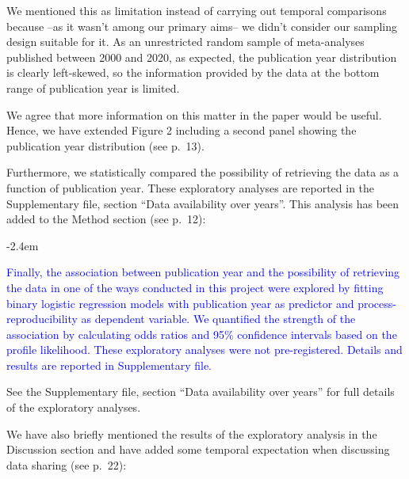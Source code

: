 \documentclass[draft]{article}
\renewenvironment{quote}{\begin{fquote}\advance\leftmargini -2.4em\begin{oldquote}}{\end{oldquote}\end{fquote}}
\newenvironment{fquote}
  {\def\FrameCommand{
	\fboxsep=0.6em %
	\fcolorbox{black}{white}}%
    \MakeFramed {\advance\hsize-2\width \FrameRestore}
    \begin{minipage}{\linewidth}
  }
  {\end{minipage}\endMakeFramed}
\begin{document}

We mentioned this as limitation instead of carrying out temporal comparisons because --as it wasn't among our primary aims-- we didn't consider our sampling design suitable for it. As an unrestricted random sample of meta-analyses published between 2000 and 2020, as expected, the publication year distribution is clearly left-skewed, so the information provided by the data at the bottom range of publication year is limited.

We agree that more information on this matter in the paper would be useful. Hence, we have extended Figure 2 including a second panel showing the publication year distribution (see p.~13).

Furthermore, we statistically compared the possibility of retrieving the data as a function of publication year. These exploratory analyses are reported in the Supplementary file, section ``Data availability over years''. This analysis has been added to the Method section (see p.~12):

\begin{quote}
\textcolor{blue}{Finally, the association between publication year and the possibility of retrieving the data in one of the ways conducted in this project were explored by fitting binary logistic regression models with publication year as predictor and process-reproducibility as dependent variable. We quantified the strength of the association by calculating odds ratios and 95\% confidence intervals based on the profile likelihood. These exploratory analyses were  not pre-registered. Details and results are reported in Supplementary file.}
\end{quote}

See the Supplementary file, section ``Data availability over years'' for full details of the exploratory analyses.

We have also briefly mentioned the results of the exploratory analysis in the Discussion section and have added some temporal expectation when discussing data sharing (see p.~22):
\end{document}
